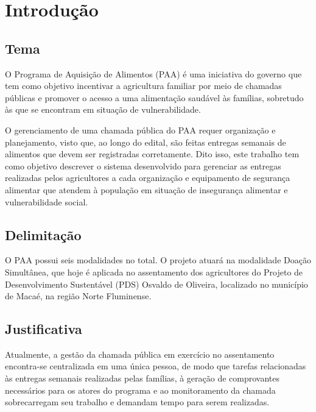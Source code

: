 \documentclass[grad,pdftex]{poli}
\begin{document}
\clearpage{}
  \tableofcontents
  \listoffigures
  \printlosymbols
  \printloabbreviations

  \mainmatter
    \clearpage{}\chapter{Introdução}

\section{Tema}

O Programa de Aquisição de Alimentos (PAA) é uma iniciativa do governo que tem como objetivo incentivar a agricultura familiar por meio de chamadas públicas e promover o acesso a uma alimentação saudável às famílias, sobretudo às que se encontram em situação de vulnerabilidade.

O gerenciamento de uma chamada pública do PAA requer organização e planejamento, visto que, ao longo do edital, são feitas entregas semanais de alimentos que devem ser registradas corretamente. Dito isso, este trabalho tem como objetivo descrever o sistema desenvolvido para gerenciar as entregas realizadas pelos agricultores a cada organização e equipamento de segurança alimentar que atendem à população em situação de insegurança alimentar e vulnerabilidade social.



\section{Delimitação}

O PAA possui seis modalidades no total. O projeto atuará na modalidade Doação Simultânea, que hoje é aplicada no assentamento dos agricultores do Projeto de Desenvolvimento Sustentável (PDS) Osvaldo de Oliveira, localizado no município de Macaé, na região Norte Fluminense.

\section{Justificativa}

Atualmente, a gestão da chamada pública em exercício no assentamento encontra-se centralizada em uma única pessoa, de modo que tarefas relacionadas às entregas semanais realizadas pelas famílias, à geração de comprovantes necessários para os atores do programa e ao monitoramento da chamada sobrecarregam seu trabalho e demandam tempo para serem realizadas.
\end{document}
